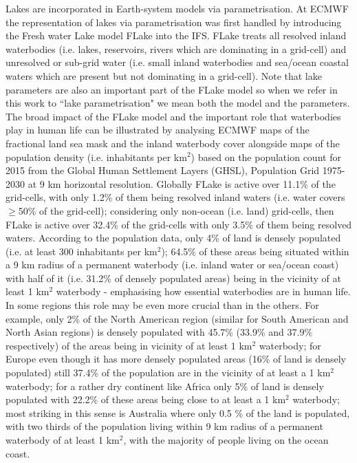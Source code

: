 \documentclass[hess, manuscript]{copernicus}
\begin{document}
\noindent Lakes are incorporated in Earth-system models via parametrisation. At ECMWF the  representation of lakes via parametrisation was first handled by introducing the Fresh water Lake model FLake \citep{Mironov2008} into the IFS. FLake treats all resolved inland waterbodies (i.e. lakes, reservoirs, rivers which are dominating in a grid-cell) and unresolved or sub-grid water (i.e. small inland waterbodies and sea/ocean coastal waters which are present but not dominating in a grid-cell). Note that lake parameters are also an important part of the FLake model so when we refer in this work to ``lake parametrisation" we mean both the model and the parameters. The broad impact of the FLake model and the important role that waterbodies play in human life can be illustrated by analysing ECMWF maps of the fractional land sea mask and the inland waterbody cover alongside maps of the population density (i.e. inhabitants per km$^2$) based on the population count for 2015 from the Global Human Settlement Layers (GHSL), Population Grid 1975-2030 \citep{GHS,JRC100523} at 9 km horizontal resolution. Globally FLake is active over 11.1\% of the grid-cells, with only 1.2\% of them being resolved inland waters (i.e. water covers $\geq$50\% of the grid-cell); considering only non-ocean (i.e. land) grid-cells, then FLake is active over 32.4\% of the grid-cells with only 3.5\% of them being resolved waters. According to the population data, only 4\% of land is densely populated (i.e. at least 300 inhabitants per km$^2$); 64.5\% of these areas being situated within a 9 km radius of a permanent waterbody (i.e. inland water or sea/ocean coast) with half of it (i.e. 31.2\% of densely populated areas) being in the vicinity of at least 1 km$^2$ waterbody - emphasising how essential waterbodies are in human life. In some regions this role may be even more crucial than in the others. For example, only 2\% of the North American region (similar for South American and North Asian regions) is densely populated with 45.7\% (33.9\% and 37.9\% respectively) of the areas being in vicinity of at least 1 km$^2$ waterbody; for Europe even though it has more densely populated areas (16\% of land is densely populated) still 37.4\% of the population are in the vicinity of at least a 1 km$^2$ waterbody; for a rather dry continent like Africa only 5\% of land is densely populated with 22.2\% of these areas being close to at least a 1 km$^2$ waterbody; most striking in this sense is Australia where only 0.5 \% of the land is populated, with two thirds of the population living within 9 km radius of a permanent waterbody of at least 1 km$^2$, with the majority of people living on the ocean coast. \newline 
\end{document}
